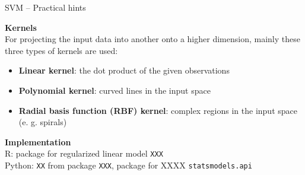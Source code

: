 \documentclass[11pt,compress,t,notes=noshow, xcolor=table]{beamer}
\newcommand{\highlight}[1]{\textcolor{highlightcol}{\textbf{#1}}}
\let\code=\texttt
\begin{document}

\begin{frame}{SVM -- Practical hints}

\footnotesize

  \highlight{Kernels} \\
  \smallskip
 For projecting the input data into another onto a higher dimension, mainly these three types of kernels are used: 
 \begin{itemize}
 
 \item \textbf{Linear kernel}: the dot product of the given observations
 
 \item \textbf{Polynomial kernel}: curved lines in the input space
 
 \item \textbf{Radial basis function (RBF) kernel}: complex regions in the input space (e. g. spirals)
 
 \end{itemize}
 
 

\lz

  \highlight{Implementation} \\
  \smallskip
  R: package for regularized linear model \code{XXX}\\
  Python: \code{XX} from package \code{XXX}, package for XXXX \code{statsmodels.api}

\end{frame}

\end{document}
